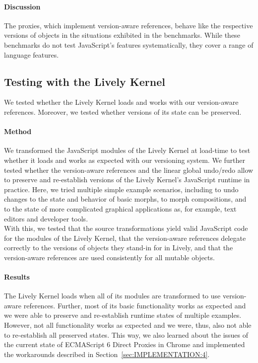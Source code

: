 \paragraph{Discussion}
The proxies, which implement version-aware references, behave like the respective versions of objects in the situations exhibited in the benchmarks.
While these benchmarks do not test JavaScript's features systematically, they cover a range of language features.


\subsection{Testing with the Lively Kernel}

We tested whether the Lively Kernel loads and works with our version-aware references.
Moreover, we tested whether versions of its state can be preserved.

\paragraph{Method}
We transformed the JavaScript modules of the Lively Kernel at load-time to test whether it loads and works as expected with our versioning system.
We further tested whether the version-aware references and the linear global undo/redo allow to preserve and re-establish versions of the Lively Kernel's JavaScript runtime in practice.
Here, we tried multiple simple example scenarios, including to undo changes to the state and behavior of basic morphs, to morph compositions, and to the state of more complicated graphical applications as, for example, text editors and developer tools.\\
With this, we tested that the source transformations yield valid JavaScript code for the modules of the Lively Kernel, that the version-aware references delegate correctly to the versions of objects they stand-in for in Lively, and that the version-aware references are used consistently for all mutable objects.


\paragraph{Results}
The Lively Kernel loads when all of its modules are transformed to use version-aware references.
Further, most of its basic functionality works as expected and we were able to preserve and re-establish runtime states of multiple examples.
However, not all functionality works as expected and we were, thus, also not able to re-establish all preserved states. 
This way, we also learned about the issues of the current state of ECMAScript 6 Direct Proxies in Chrome and implemented the workarounds described in Section~\ref{sec:IMPLEMENTATION:4}.

